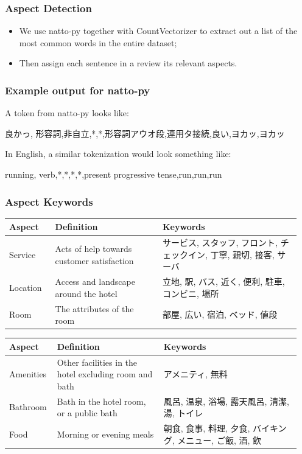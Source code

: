 \documentclass[11pt]{beamer}
\begin{document}
	\begin{frame}
		\frametitle{Aspect Detection}
		\begin{itemize}
			\item We use natto-py together with CountVectorizer to extract out a list of the most common words in the entire dataset;
			\item Then assign each sentence in a review its relevant aspects.
		\end{itemize}
	\end{frame}
	
	\begin{frame}
		\frametitle{Example output for natto-py}
		A token from natto-py looks like: \begin{center}
			良かっ,	形容詞,非自立,*,*,形容詞アウオ段,連用タ接続,良い,ヨカッ,ヨカッ
		\end{center}
		\pause
		In English, a similar tokenization would look something like: \begin{center}
			running,	verb,*,*,*,*,present progressive tense,run,run,run
		\end{center}
	\end{frame}
	
	\begin{frame}[allowframebreaks]
		\frametitle{Aspect Keywords}
		\begin{table}
			{\renewcommand{\arraystretch}{1.5}
				\renewcommand{\tabcolsep}{0.2cm}
				\begin{tabular}{|p{0.15\linewidth}|p{0.35\linewidth}|p{0.45\linewidth}|}
					\hline
					Aspect & Definition & Keywords\\
					\hline
					Service & Acts of help towards customer satisfaction & サービス, スタッフ, フロント, チェックイン, 丁寧, 親切, 接客, サーバ\\
					\hline
					Location & Access and landscape around the hotel & 立地, 駅, バス, 近く, 便利, 駐車, コンビニ, 場所\\
					\hline
					Room & The attributes of the room & 部屋, 広い, 宿泊, ベッド, 値段\\
					\hline
			\end{tabular}}
		\end{table}
		
		\begin{table}
			{\renewcommand{\arraystretch}{1.5}
			\renewcommand{\tabcolsep}{0.2cm}
			\begin{tabular}{|p{0.15\linewidth}|p{0.35\linewidth}|p{0.45\linewidth}|}
				\hline
				Aspect & Definition & Keywords\\
				\hline
				Amenities & Other facilities in the hotel excluding room and bath & アメニティ, 無料\\
				\hline
				Bathroom & Bath in the hotel room, or a public bath & 風呂, 温泉, 浴場, 露天風呂, 清潔, 湯, トイレ\\
				\hline
				Food & Morning or evening meals & 朝食, 食事, 料理, 夕食, バイキング, メニュー, ご飯, 酒, 飲\\
				\hline
			\end{tabular}}
		\end{table}
	\end{frame}
	
\end{document}
